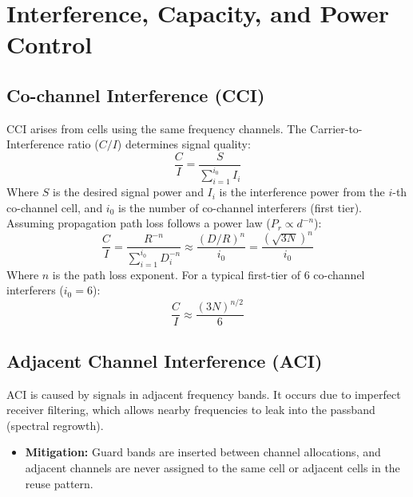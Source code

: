 \documentclass[12pt,a4paper]{article}
\begin{document}
\section{Interference, Capacity, and Power Control}

\subsection{Co-channel Interference (CCI)}
CCI arises from cells using the same frequency channels. The Carrier-to-Interference ratio ($C/I$) determines signal quality:
\begin{equation}
  \frac{C}{I} = \frac{S}{\sum_{i=1}^{i_0} I_i}
\end{equation}
Where $S$ is the desired signal power and $I_i$ is the interference power from the $i$-th co-channel cell, and $i_0$ is the number of co-channel interferers (first tier).
Assuming propagation path loss follows a power law ($P_r \propto d^{-n}$):
\begin{equation}
  \frac{C}{I} = \frac{R^{-n}}{\sum_{i=1}^{i_0} D_i^{-n}} \approx \frac{(D/R)^n}{i_0} = \frac{(\sqrt{3N})^n}{i_0}
\end{equation}
Where $n$ is the path loss exponent. For a typical first-tier of 6 co-channel interferers ($i_0 = 6$):
\begin{equation}
  \frac{C}{I} \approx \frac{(3N)^{n/2}}{6}
\end{equation}

\subsection{Adjacent Channel Interference (ACI)}
ACI is caused by signals in adjacent frequency bands. It occurs due to imperfect receiver filtering, which allows nearby frequencies to leak into the passband (spectral regrowth).
\begin{itemize}[leftmargin=*, itemsep=2.5pt]
  \item \textbf{Mitigation:} Guard bands are inserted between channel allocations, and adjacent channels are never assigned to the same cell or adjacent cells in the reuse pattern.
\end{itemize}
\end{document}
